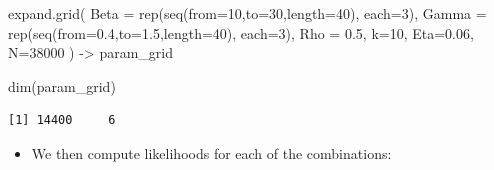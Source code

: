 \documentclass[
  letterpaper,
  DIV=11,
  numbers=noendperiod]{scrartcl}
\newenvironment{Shaded}{\begin{snugshade}}{\end{snugshade}}
\newcommand{\AttributeTok}[1]{\textcolor[rgb]{0.40,0.45,0.13}{#1}}
\newcommand{\DecValTok}[1]{\textcolor[rgb]{0.68,0.00,0.00}{#1}}
\newcommand{\FloatTok}[1]{\textcolor[rgb]{0.68,0.00,0.00}{#1}}
\newcommand{\FunctionTok}[1]{\textcolor[rgb]{0.28,0.35,0.67}{#1}}
\newcommand{\NormalTok}[1]{\textcolor[rgb]{0.00,0.23,0.31}{#1}}
\newcommand{\OtherTok}[1]{\textcolor[rgb]{0.00,0.23,0.31}{#1}}
\newcommand{\SpecialCharTok}[1]{\textcolor[rgb]{0.37,0.37,0.37}{#1}}
\newcommand{\StringTok}[1]{\textcolor[rgb]{0.13,0.47,0.30}{#1}}
\providecommand{\tightlist}{%
  \setlength{\itemsep}{0pt}\setlength{\parskip}{0pt}}\usepackage{longtable,booktabs,array}
\begin{document}
\begin{Shaded}
\begin{Highlighting}[]
\FunctionTok{expand.grid}\NormalTok{(}
  \AttributeTok{Beta =} \FunctionTok{rep}\NormalTok{(}\FunctionTok{seq}\NormalTok{(}\AttributeTok{from=}\DecValTok{10}\NormalTok{,}\AttributeTok{to=}\DecValTok{30}\NormalTok{,}\AttributeTok{length=}\DecValTok{40}\NormalTok{), }\AttributeTok{each=}\DecValTok{3}\NormalTok{),}
  \AttributeTok{Gamma =} \FunctionTok{rep}\NormalTok{(}\FunctionTok{seq}\NormalTok{(}\AttributeTok{from=}\FloatTok{0.4}\NormalTok{,}\AttributeTok{to=}\FloatTok{1.5}\NormalTok{,}\AttributeTok{length=}\DecValTok{40}\NormalTok{), }\AttributeTok{each=}\DecValTok{3}\NormalTok{),}
  \AttributeTok{Rho =} \FloatTok{0.5}\NormalTok{, }\AttributeTok{k=}\DecValTok{10}\NormalTok{, }\AttributeTok{Eta=}\FloatTok{0.06}\NormalTok{, }\AttributeTok{N=}\DecValTok{38000}
\NormalTok{) }\OtherTok{{-}\textgreater{}}\NormalTok{ param\_grid}

\FunctionTok{dim}\NormalTok{(param\_grid)}
\end{Highlighting}
\end{Shaded}

\begin{verbatim}
[1] 14400     6
\end{verbatim}

\framebreak

\begin{itemize}
\tightlist
\item
  We then compute likelihoods for each of the combinations:
\end{itemize}

\begin{Shaded}
\end{Shaded}
\end{document}
